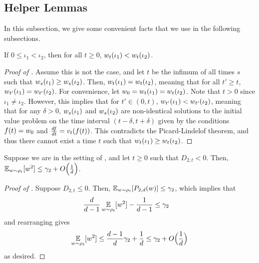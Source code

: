 \subsection{Helper Lemmas}


In this subsection, we give some convenient facts that we use in the following subsections.

\begin{proposition} \label{prop:particle_order}
If $0 \leq \iota_1 < \iota_2$, then for all $t \geq 0$, $w_t(\iota_1) < w_t(\iota_2)$.
\end{proposition}
\begin{proof}[Proof of ]
Assume this is not the case, and let $t$ be the infimum of all times $s$ such that $w_s(\iota_1) \geq w_s(\iota_2)$. Then, $w_t(\iota_1) = w_t(\iota_2)$, meaning that for all $t' \geq t$, $w_{t'}(\iota_1) = w_{t'}(\iota_2)$. For convenience, let $w_0 = w_t(\iota_1) = w_t(\iota_2)$. Note that $t > 0$ since $\iota_1 \neq \iota_2$. However, this implies that for $t' \in (0, t)$, $w_{t'}(\iota_1) < w_{t'}(\iota_2)$, meaning that for any $\delta > 0$, $w_s(\iota_1)$ and $w_s(\iota_2)$ are non-identical solutions to the initial value problem on the time interval $(t - \delta, t + \delta)$ given by the conditions $f(t) = w_0$ and $\frac{df}{dt} = v_t(f(t))$. This contradicts the Picard-Lindelof theorem, and thus there cannot exist a time $t$ such that $w_t(\iota_1) \geq w_t(\iota_2)$.
\end{proof}

\begin{proposition} \label{prop:d2<0}
Suppose we are in the setting of , and let $t \geq 0$ such that $D_{2, t} < 0$. Then, $\operatorname*{\mathbb{E}}_{w \sim \rho_t}[w^2] \leq \gamma_2 + O\Big(\frac{1}{d}\Big)$.
\end{proposition}
\begin{proof}[Proof of ]
Suppose $D_{2, t} \leq 0$. Then, $\operatorname*{\mathbb{E}}_{w \sim \rho_t}[{P_{2, d}}(w)] \leq \gamma_2$, which implies that 
\begin{align}
\frac{d}{d - 1} \operatorname*{\mathbb{E}}_{w \sim \rho_t}[w^2] - \frac{1}{d - 1} 
& \leq \gamma_2
\end{align}
and rearranging gives
\begin{align}
\operatorname*{\mathbb{E}}_{w \sim \rho_t}[w^2] \leq \frac{d - 1}{d} \gamma_2 + \frac{1}{d}
\leq \gamma_2 + O\Big(\frac{1}{d}\Big)
\end{align}
as desired.
\end{proof}

